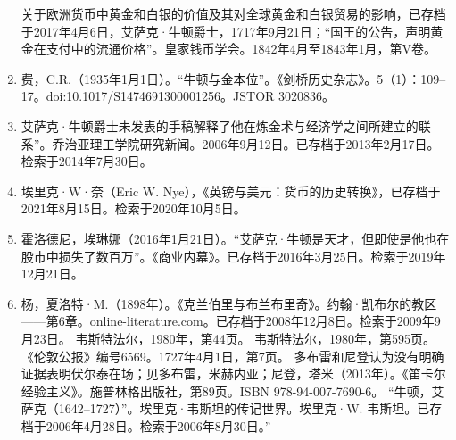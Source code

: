\begin{enumerate}
关于欧洲货币中黄金和白银的价值及其对全球黄金和白银贸易的影响，已存档于2017年4月6日，艾萨克·牛顿爵士，1717年9月21日；“国王的公告，声明黄金在支付中的流通价格”。皇家钱币学会。1842年4月至1843年1月，第V卷。  
\item 费，C.R.（1935年1月1日）。“牛顿与金本位”。《剑桥历史杂志》。5（1）：109–17。doi:10.1017/S1474691300001256。JSTOR 3020836。  
\item 艾萨克·牛顿爵士未发表的手稿解释了他在炼金术与经济学之间所建立的联系”。乔治亚理工学院研究新闻。2006年9月12日。已存档于2013年2月17日。检索于2014年7月30日。
\item 埃里克·W·奈（Eric W. Nye），《英镑与美元：货币的历史转换》，已存档于2021年8月15日。检索于2020年10月5日。  
\item 霍洛德尼，埃琳娜（2016年1月21日）。“艾萨克·牛顿是天才，但即使是他也在股市中损失了数百万”。《商业内幕》。已存档于2016年3月25日。检索于2019年12月21日。
\item 杨，夏洛特·M.（1898年）。《克兰伯里与布兰布里奇》。约翰·凯布尔的教区——第6章。online-literature.com。已存档于2008年12月8日。检索于2009年9月23日。  
韦斯特法尔，1980年，第44页。  
韦斯特法尔，1980年，第595页。  
《伦敦公报》编号6569。1727年4月1日，第7页。  
多布雷和尼登认为没有明确证据表明伏尔泰在场；见多布雷，米赫内亚；尼登，塔米（2013年）。《笛卡尔经验主义》。施普林格出版社，第89页。ISBN 978-94-007-7690-6。  
“牛顿，艾萨克（1642–1727）”。埃里克·韦斯坦的传记世界。埃里克·W. 韦斯坦。已存档于2006年4月28日。检索于2006年8月30日。”



\end{enumerate}
